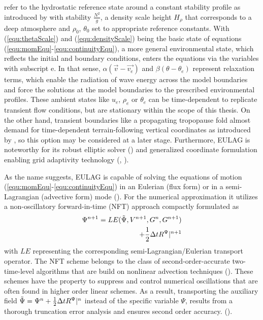 refer to the hydrostatic reference state around a constant stability profile as introduced by \textcite{bacmeister_breakdown_1989} with stability $\frac{N^2}{g}$, a density scale height $H_{\rho}$ that corresponds to a deep atmosphere and $\rho_0$, $\theta_0$ set to appropriate reference constants. With (\ref{equ:thetaScale}) and (\ref{equ:densityScale}) being the basic state of equations (\ref{equ:momEqu}-\ref{equ:continuityEqu}), a more general environmental state, which reflects the initial and boundary conditions, enters the equations via the variables with subscript e. In that sense, $\alpha(\Vec{v}-\Vec{v_e})$ and $\beta(\theta-\theta_e)$ represent relaxation terms, which enable the radiation of wave energy across the model boundaries and force the solutions at the model boundaries to the prescribed environmental profiles. These ambient states like $u_e$, $\rho_e$ or $\theta_e$ can be time-dependent to replicate transient flow conditions, but are stationary within the scope of this thesis. On the other hand, transient boundaries like a propagating tropopause fold almost demand for time-dependent terrain-following vertical coordinates as introduced by \textcite{wedi_extending_2003}, so this option may be considered at a later stage. Furthermore, EULAG is noteworthy for its robust elliptic solver (\cite{smolarkiewicz_forward--time_1993}) and generalized coordinate formulation enabling grid adaptivity technology (\cite{prusa_eulag_2008}, \cite{kuhnlein_modelling_2012}).

As the name suggests, EULAG is capable of solving the equations of motion (\ref{equ:momEqu}-\ref{equ:continuityEqu}) in an Eulerian (flux form) or in a semi-Lagrangian (advective form) mode (\cite{smolarkiewicz_forward--time_1997}). For the numerical approximation it utilizes a non-oscillatory forward-in-time (NFT) approach compactly formulated as
%
\begin{equation}
\begin{aligned}
    \Psi^{n+1} = LE(\Tilde{\Psi}, V^{n+1}, G^n, G^{n+1}) \\
    + \frac{1}{2} \Delta t R^{\Psi} |^{n+1}
    \label{equ:NFTscheme}
\end{aligned}
\end{equation}
%
with $LE$ representing the corresponding semi-Lagrangian/Eulerian transport operator. The NFT scheme belongs to the class of second-order-accurate two-time-level algorithms that are build on nonlinear advection techniques (\cite{prusa_eulag_2008}). These schemes have the property to suppress and control numerical oscillations that are often found in higher order linear schemes. As a result, transporting the auxiliary field $\Tilde{\Psi} = \Psi^n + \frac{1}{2} \Delta t R^{\Psi}|^n$ instead of the specific variable $\Psi$, results from a thorough truncation error analysis and ensures second order accuracy. (\cite{smolarkiewicz_forward--time_1997}).

